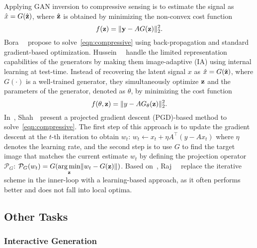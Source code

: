 Applying GAN inversion to compressive sensing is to estimate the signal as $\hat{x}=G(\hat{\mathbf{z}})$, where $\hat{\mathbf{z}}$ is obtained by minimizing the non-convex cost function
\begin{equation}
\label{eqn:compressive}
f(\z)=\|\y-AG(\z)\|_{2}^{2}. 
\end{equation}
Bora~\etal~\cite{bora2017compressed} propose to solve~\eqref{eqn:compressive} using back-propagation and standard gradient-based optimization.
Hussein~\etal~\cite{hussein2019image} handle the limited representation capabilities of the generators by making them image-adaptive (IA) using internal learning at test-time.
Instead of recovering the latent signal $x$ as $\hat{x}=G(\hat{\mathbf{z}})$, where $G(\cdot)$ is a well-trained generator, they simultaneously optimize $\mathbf{z}$ and the parameters of the generator, denoted as $\theta$, by minimizing the cost function
\begin{equation}
f(\theta, \mathbf{z})=\|y-AG_{\theta}(\mathbf{z})\|_{2}^{2}.
\end{equation}
In~\cite{shah2018solving}, Shah~\etal~present a projected gradient descent (PGD)-based method to solve~\eqref{eqn:compressive}.
The first step of this approach is to update the gradient descent at the $t$-th iteration to obtain ${w_t}$: ${w_t} \leftarrow x_t + \eta A^{\top}(y-Ax_t)$ where $\eta$ denotes the learning rate, and the second step is to use $G$ to find the target image that matches the current estimate ${w_t}$ by defining the projection operator $\mathcal{P}_G$: $\mathcal{P}_G({w_t}) = G(\underset{\mathbf{z}}{\arg\min}\|{w_t} - G(\mathbf{z})\|)$.
Based on~\cite{shah2018solving}, Raj~\etal~\cite{raj2019gan} replace the iterative scheme in the inner-loop with a learning-based approach, as it often performs better and does not fall into local optima.

\subsection{Other Tasks}
\subsubsection{Interactive Generation}
\label{sec:interactive}

